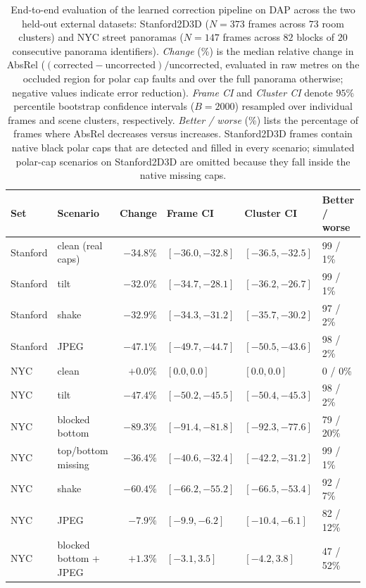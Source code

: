 \documentclass{article}
\newcommand{\absrel}{AbsRel}
\begin{document}
\begin{table}[t]\centering\small
\caption{End-to-end evaluation of the learned correction pipeline on DAP across the two held-out external datasets: Stanford2D3D ($N=373$ frames across $73$ room clusters) and NYC street panoramas ($N=147$ frames across $82$ blocks of $20$ consecutive panorama identifiers). \emph{Change} (\%) is the median relative change in \absrel{} ($(\text{corrected}-\text{uncorrected})/\text{uncorrected}$, evaluated in raw metres on the occluded region for polar cap faults and over the full panorama otherwise; negative values indicate error reduction). \emph{Frame CI} and \emph{Cluster CI} denote $95\%$ percentile bootstrap confidence intervals ($B=2000$) resampled over individual frames and scene clusters, respectively. \emph{Better / worse} (\%) lists the percentage of frames where \absrel{} decreases versus increases. Stanford2D3D frames contain native black polar caps that are detected and filled in every scenario; simulated polar-cap scenarios on Stanford2D3D are omitted because they fall inside the native missing caps.}\label{tab:ext}
\begin{tabular}{llrlll}\toprule
Set & Scenario & Change & Frame CI & Cluster CI & Better / worse\\\midrule
Stanford & clean (real caps) & $-34.8\%$ & $[-36.0,-32.8]$ & $[-36.5,-32.5]$ & 99 / 1\%\\
Stanford & tilt & $-32.0\%$ & $[-34.7,-28.1]$ & $[-36.2,-26.7]$ & 99 / 1\%\\
Stanford & shake & $-32.9\%$ & $[-34.3,-31.2]$ & $[-35.7,-30.2]$ & 97 / 2\%\\
Stanford & JPEG & $-47.1\%$ & $[-49.7,-44.7]$ & $[-50.5,-43.6]$ & 98 / 2\%\\
NYC & clean & $+0.0\%$ & $[0.0,0.0]$ & $[0.0,0.0]$ & 0 / 0\%\\
NYC & tilt & $-47.4\%$ & $[-50.2,-45.5]$ & $[-50.4,-45.3]$ & 98 / 2\%\\
NYC & blocked bottom & $-89.3\%$ & $[-91.4,-81.8]$ & $[-92.3,-77.6]$ & 79 / 20\%\\
NYC & top/bottom missing & $-36.4\%$ & $[-40.6,-32.4]$ & $[-42.2,-31.2]$ & 99 / 1\%\\
NYC & shake & $-60.4\%$ & $[-66.2,-55.2]$ & $[-66.5,-53.4]$ & 92 / 7\%\\
NYC & JPEG & $-7.9\%$ & $[-9.9,-6.2]$ & $[-10.4,-6.1]$ & 82 / 12\%\\
NYC & blocked bottom + JPEG & $+1.3\%$ & $[-3.1,3.5]$ & $[-4.2,3.8]$ & 47 / 52\%\\
\bottomrule\end{tabular}
\end{table}
\end{document}
